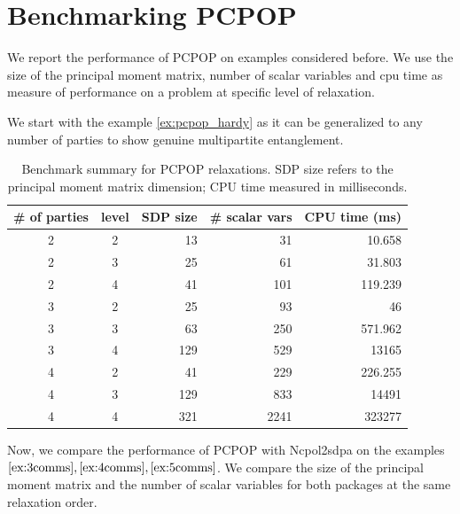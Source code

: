 \section{Benchmarking PCPOP}
\label{sec:benchmark}
We report the performance of PCPOP on examples considered before. We use the size of the principal moment matrix, number of scalar variables and cpu time as measure of performance on a problem at specific level of relaxation.

We start with the example \ref{ex:pcpop_hardy} as it can be generalized to any number of parties to show genuine multipartite entanglement.

\begin{table}[H]
	\centering
	\caption{Benchmark summary for PCPOP relaxations. SDP size refers to the principal moment matrix dimension; CPU time measured in milliseconds.}
	\label{tab:pcpop-bench}
	\begin{tabular}{@{}ccrrr@{}}
		\# of parties & level & SDP size & \# scalar vars& CPU time (ms) \\
		\midrule
		2 & 2 & 13 & 31 & 10.658 \\
		2 & 3 & 25 & 61 & 31.803 \\
		2 & 4 & 41 & 101 & 119.239 \\
		3 & 2 & 25 & 93 &  46\\
        3 & 3 & 63 & 250 & 571.962 \\
        3 & 4 & 129 & 529 & 13165 \\
        4 & 2 & 41 & 229 & 226.255 \\
        4 & 3 & 129 & 833 & 14491 \\
        4 & 4 & 321 & 2241 & 323277 \\ 
		\bottomrule
	\end{tabular}
\end{table}
Now, we compare the performance of PCPOP with Ncpol2sdpa on the examples $\ref{ex:3comms},\ref{ex:4comms},\ref{ex:5comms}$. We compare the size of the principal moment matrix and the number of scalar variables for both packages at the same relaxation order.
